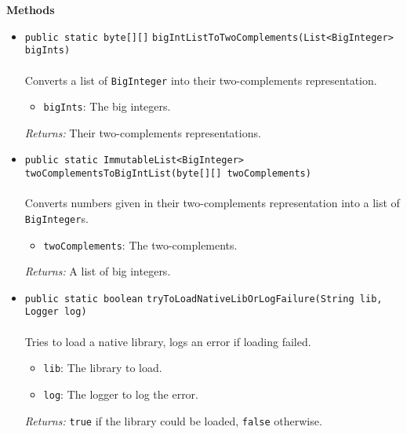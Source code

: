 \textbf{\sffamily Methods}
\begin{itemize}
\item \lstinline|public static byte[][]| \lstinline|bigIntListToTwoComplements|\lstinline|(List<BigInteger> bigInts)|\\ \\[-0.6em]
Converts a list of \lstinline|BigInteger| into their two-complements representation.
\begin{itemize}
\item \lstinline|bigInts|: The big integers.
\end{itemize}

\emph{Returns:} Their two-complements representations.

\item \lstinline|public static ImmutableList<BigInteger>| \lstinline|twoComplementsToBigIntList|\lstinline|(byte[][] twoComplements)|\\ \\[-0.6em]
Converts numbers given in their two-complements representation  into a list of
 \lstinline|BigInteger|s.
\begin{itemize}
\item \lstinline|twoComplements|: The two-complements.
\end{itemize}

\emph{Returns:} A list of big integers.

\item \lstinline|public static boolean| \lstinline|tryToLoadNativeLibOrLogFailure|\lstinline|(String lib, Logger log)|\\ \\[-0.6em]
Tries to load a native library, logs an error if loading failed.
\begin{itemize}
\item \lstinline|lib|: The library to load.
\item \lstinline|log|: The logger to log the error.
\end{itemize}

\emph{Returns:} \lstinline|true| if the library could be loaded, \lstinline|false| otherwise.

\end{itemize}

